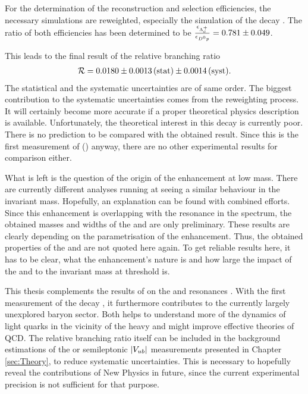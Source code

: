 For the determination of the reconstruction and selection efficiencies, the necessary simulations are reweighted, especially the simulation of the decay \LbToDpmunuX.
The ratio of both efficiencies has been determined to be $\frac{\epsilon_{{{\Lambda}^+_{c}}}}{\epsilon_{{{D}^0}{p}}} = 0.781 \pm 0.049$.

This leads to the final result of the relative branching ratio
\begin{align*}
    \mathcal{R} = 0.0180 \pm 0.0013\mathrm{\,(stat)} \pm 0.0014\mathrm{\,(syst)}.
\end{align*}
The statistical and the systematic uncertainties are of same order.
The biggest contribution to the systematic uncertainties comes from the reweighting process.
It will certainly become more accurate if a proper theoretical physics description is available.
Unfortunately, the theoretical interest in this decay is currently poor.
There is no prediction to be compared with the obtained result.
Since this is the first measurement of \BR(\LbToDpmunuX) anyway, there are no other experimental results for comparison either.

What is left is the question of the origin of the enhancement at low \Dz\proton mass.
There are currently different analyses running at \lhcb seeing a similar behaviour in the invariant \Dz\proton mass.
Hopefully, an explanation can be found with combined efforts.
Since this enhancement is overlapping with the \LcResI resonance in the \Dz\proton spectrum, the obtained masses and widths of the \LcResI and \LcResII are only preliminary.
These results are clearly depending on the parametrisation of the enhancement.
Thus, the obtained properties of the \LcResI and \LcResII are not quoted here again.
To get reliable results here, it has to be clear, what the enhancement's nature is and how large the impact of the  and  to the invariant \Dz\proton mass at threshold is.

This thesis complements the results of \babar on the \LcResI and \LcResII resonances \cite{BaBar_D0p}.
With the first measurement of the decay \LbToDpmunuX, it furthermore contributes to the currently largely unexplored \bquark baryon sector.
Both helps to understand more of the dynamics of light quarks in the vicinity of the heavy \bquark and might improve effective theories of QCD.
The relative branching ratio \R itself can be included in the background estimations of the \asld or semileptonic $|{V_{{u}{b}}}|$ measurements presented in Chapter \ref{sec:Theory}, to reduce systematic uncertainties.
This is necessary to hopefully reveal the contributions of New Physics in future, since the current experimental precision is not sufficient for that purpose.
